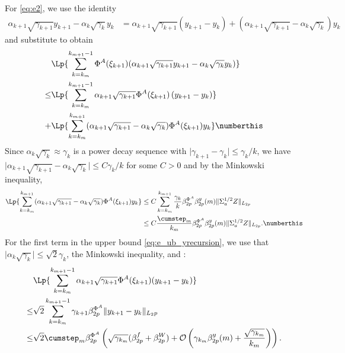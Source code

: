 \documentclass[11pt]{article}
\begin{document}
For \eqref{eq:e2}, we use the identity
\begin{align*}
    \alpha_{k+1} \sqrt{\gamma_{k+1}} y_{k+1} - \alpha_k \sqrt{\gamma_k} y_k 
    &=
    \alpha_{k+1} \sqrt{\gamma_{k+1}} (y_{k+1} - y_k) + (\alpha_{k+1} \sqrt{\gamma_{k+1}} - \alpha_k \sqrt{\gamma_k}) y_k 
\end{align*}
and substitute to obtain
\begin{align*}
    &\Lp{    \sum_{k=k_m}^{k_{m+1} - 1} \Phi^A (\xi_{k+1}) (\alpha_{k+1} \sqrt{\gamma_{k+1}} y_{k+1} - \alpha_k \sqrt{\gamma_k} y_k )}
    \\
    \leq &
    \Lp{\sum_{k=k_m}^{k_{m+1} - 1} \alpha_{k+1} \sqrt{\gamma_{k+1}}\Phi^A(\xi_{k+1})  \left( y_{k+1} -  y_k   \right)}
    \\ 
    + &
    \Lp{\sum_{k=k_m}^{k_{m+1}}
    (\alpha_{k+1} \sqrt{\gamma_{k+1}} - \alpha_k \sqrt{\gamma_k}) \Phi^A (\xi_{k+1}) y_k 
    }
    \numberthis \label{eq:e_ub_yrecursion}
\end{align*}
Since $\alpha_k \sqrt{\gamma_k} \approx \gamma_k$ is a power decay sequence with $\lvert \gamma_{k+1} - \gamma_k\rvert \leq \gamma_k/k$, we have $\lvert \alpha_{k+1} \sqrt{\gamma_{k+1}} - \alpha_k \sqrt{\gamma_k}\rvert \leq C \gamma_k/k$ for some $C > 0$ and by the Minkowski inequality,
\begin{align*}
    \Lp{\sum_{k=k_m}^{k_{m+1}}
    (\alpha_{k+1} \sqrt{\gamma_{k+1}} - \alpha_k \sqrt{\gamma_k}) \Phi^A (\xi_{k+1}) y_k }
    &\leq 
    C \sum_{k=k_m}^{k_{m+1}} \frac{\gamma_k}{k} \beta_{2p}^{\Phi^A} \beta_{2p}^y (m) \lVert \Sigma_a^{1/2}Z  \rVert_{L_{2p}}
    \\ &
    \leq
    C \frac{\cumstep_m}{k_m} \beta_{2p}^{\Phi^A} \beta_{2p}^y(m) \lVert \Sigma_a^{1/2} Z \rVert_{L_{2p}} . 
    \numberthis \label{eq:temp1}
\end{align*}
For the first term in the upper bound \eqref{eq:e_ub_yrecursion}, we use that $\lvert \alpha_k \sqrt{\gamma_k} \rvert \leq \sqrt{2} \gamma_k$, the Minkowski inequality, and :
\begin{align*}
    &\Lp{\sum_{k=k_m}^{k_{m+1} - 1} \alpha_{k+1} \sqrt{\gamma_{k+1}} \Phi^A (\xi_{k+1}) (y_{k+1} - y_k)}
    \\ 
    \leq&
    \sqrt{2} \sum_{k=k_m}^{k_{m+1} - 1} \gamma_{k+1} \beta_{2p}^{\Phi^A} \lVert y_{k+1} - y_k\rVert_{L_2p}
    \\ 
    \leq& 
    \sqrt{2} \cumstep_m \beta_{2p}^{\Phi^A} \left(\sqrt{\gamma_{k_m}} (\beta_{2p}^f + \beta_{2p}^W)
    + \mathcal{O}\left(\gamma_{k_m} \beta_{2p}^y (m) + \frac{\sqrt{\gamma_{k_m}}}{k_m} \right)\right) . 
\end{align*}
\end{document}
